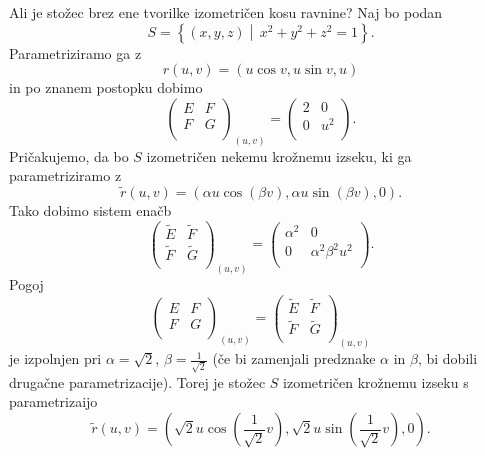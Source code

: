 \begin{primer}
 Ali je stožec brez ene tvorilke izometričen kosu ravnine? Naj bo podan 
 \begin{equation*} S = \left\{ (x,y,z)  \middle|\, x^2 + y^2 + z^2 = 1 \right\}.\end{equation*}
 Parametriziramo ga z
 \begin{equation*} r(u,v) = (u \cos v, u \sin v, u) \end{equation*}in po znanem postopku dobimo 
 \begin{equation*} \begin{pmatrix}
  E & F\\
  F & G\\
 \end{pmatrix}_{(u,v)} 
 = \begin{pmatrix}
  2 & 0\\
  0 & u^2\\
 \end{pmatrix}.\end{equation*}
Pričakujemo, da bo $S$ izometričen nekemu krožnemu izseku, ki ga parametriziramo z 
\begin{equation*} \tilde{r}(u,v) = (\alpha u \cos(\beta v), \alpha u \sin(\beta v), 0).\end{equation*}Tako dobimo sistem enačb 
\begin{equation*} \begin{pmatrix}
  \tilde{E} & \tilde{F}\\
  \tilde{F} & \tilde{G}\\
 \end{pmatrix}_{(u,v)} 
 = \begin{pmatrix}
  \alpha^2 & 0\\
  0 & \alpha^2 \beta^2 u^2\\
 \end{pmatrix}.\end{equation*}
Pogoj  \begin{equation*} \begin{pmatrix}
  E & F\\
  F & G\\
 \end{pmatrix}_{(u,v)}
 = \begin{pmatrix}
  \tilde{E} & \tilde{F}\\
  \tilde{F} & \tilde{G}\\
 \end{pmatrix}_{(u,v)}\end{equation*}je izpolnjen pri $\alpha = \sqrt{2},\, \beta = \frac{1}{\sqrt{2}}$ (če bi zamenjali predznake $\alpha$ in $\beta$, bi dobili drugačne parametrizacije).
 Torej je stožec $S$ izometričen krožnemu izseku s parametrizaijo  
 \begin{equation*} \tilde{r}(u,v) = \left(\sqrt{2}  u \cos(\frac{1}{\sqrt{2}} v), \sqrt{2}  u \sin(\frac{1}{\sqrt{2}} v), 0 \right).\end{equation*}
\end{primer}

